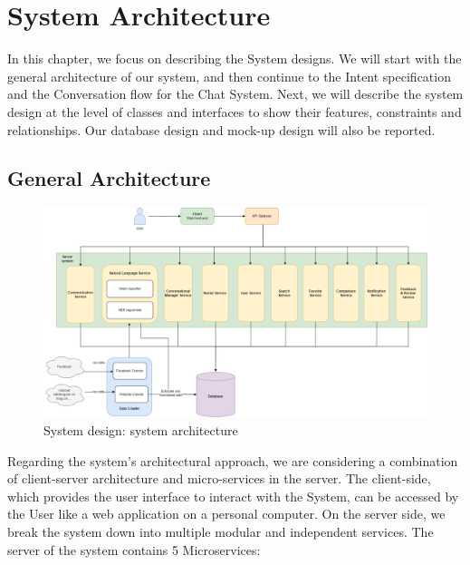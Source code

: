 \chapter{System Architecture}
In this chapter, we focus on describing the System designs. We will start with the general architecture of our system, and then continue to the Intent specification and the Conversation flow for the Chat System. Next, we will describe the system design at the level of classes and interfaces to show their features, constraints and relationships. Our database design and mock-up design will also be reported.
\section{General Architecture}
\begin{figure}[H]
    \centering
    \includegraphics[width=\textwidth]{Images/System_architecture.png}
    \caption{System design: system architecture}
    \label{fig:sys-architect}
\end{figure}
Regarding the system's architectural approach, we are considering a combination of client-server architecture and micro-services in the server. The client-side, which provides the user interface to interact with the System, can be accessed by the User like a web application on a personal computer. On the server side, we break the system down into multiple modular and independent services. The server of the system contains 5 Microservices:
